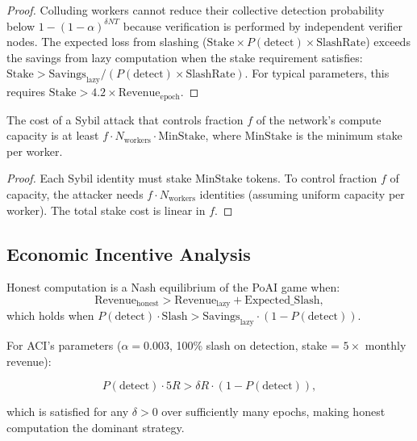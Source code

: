 \begin{proof}
Colluding workers cannot reduce their collective detection probability below $1 - (1-\alpha)^{\delta N T}$ because verification is performed by independent verifier nodes. The expected loss from slashing ($\text{Stake} \times P(\text{detect}) \times \text{SlashRate}$) exceeds the savings from lazy computation when the stake requirement satisfies:
$\text{Stake} > \text{Savings}_{\text{lazy}} / (P(\text{detect}) \times \text{SlashRate})$.
For typical parameters, this requires $\text{Stake} > 4.2 \times \text{Revenue}_{\text{epoch}}$.
\end{proof}

\begin{theorem}
The cost of a Sybil attack that controls fraction $f$ of the network's compute capacity is at least $f \cdot N_{\text{workers}} \cdot \text{MinStake}$, where $\text{MinStake}$ is the minimum stake per worker.
\end{theorem}

\begin{proof}
Each Sybil identity must stake $\text{MinStake}$ tokens. To control fraction $f$ of capacity, the attacker needs $f \cdot N_{\text{workers}}$ identities (assuming uniform capacity per worker). The total stake cost is linear in $f$.
\end{proof}

\subsection{Economic Incentive Analysis}

\begin{proposition}
Honest computation is a Nash equilibrium of the PoAI game when:
\begin{equation}
\text{Revenue}_{\text{honest}} > \text{Revenue}_{\text{lazy}} + \text{Expected\_Slash},
\end{equation}
which holds when $P(\text{detect}) \cdot \text{Slash} > \text{Savings}_{\text{lazy}} \cdot (1 - P(\text{detect}))$.
\end{proposition}

For ACI's parameters ($\alpha = 0.003$, 100\% slash on detection, stake = $5\times$ monthly revenue):

\begin{equation}
P(\text{detect}) \cdot 5R > \delta R \cdot (1 - P(\text{detect})),
\end{equation}

which is satisfied for any $\delta > 0$ over sufficiently many epochs, making honest computation the dominant strategy.


